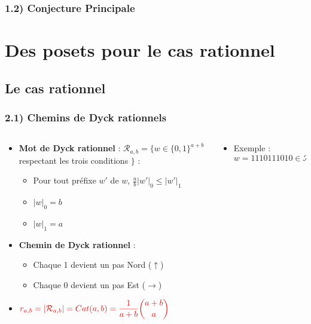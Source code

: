 \documentclass{beamer}
\begin{document}
\begin{frame}
    \frametitle{1.2) Conjecture Principale}
\end{frame}

\section{Des posets pour le cas rationnel}

\subsection{Le cas rationnel}

\begin{frame}
    \frametitle{2.1) Chemins de Dyck rationnels}
    \begin{columns}
        \begin{column}{0.65\textwidth}
            \begin{itemize}
                \item \textbf{Mot de Dyck rationnel} : $\mathcal{R}_{a,b} =
                \{w \in \{0,1\}^{a+b}$ respectant les trois conditions $\}$ :
                \begin{itemize}
                    \item Pour tout préfixe $w'$ de $w$, $\frac{a}{b}|w'|_0
                     \leqslant |w'|_1$
                     \item $|w|_0 = b$
                     \item $|w|_1 = a$
                \end{itemize}
                \item \textbf{Chemin de Dyck rationnel} :
                \begin{itemize}
                    \item Chaque 1 devient un pas Nord ($\uparrow$)
                    \item Chaque 0 devient un pas Est ($\rightarrow$)
                \end{itemize}
                \item $\color{red}{\displaystyle r_{a,b} = |\mathcal{R}_{a,b}|
                = Cat(a,b) = \frac{1}{a+b}\binom{a+b}{a}}$
            \end{itemize}
        \end{column}
        \begin{column}{0.35\textwidth}
            \begin{itemize}
                \item Exemple : $w = 1110111010 \in \mathcal{R}_{7,3}$
            \end{itemize}
            
        \end{column}
    \end{columns}
\end{frame}
\end{document}
